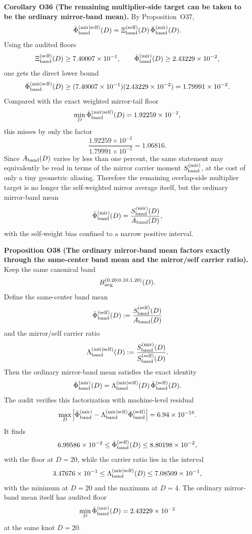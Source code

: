 \documentclass[aps,prd,onecolumn,notitlepage,nofootinbib,superscriptaddress,11pt,floatfix]{revtex4-2}
\begin{document}
\medskip\noindent\textbf{Corollary O36 (The remaining multiplier-side target can be taken to be the ordinary mirror-band mean).}
By Proposition~O37,
\[
\bar\Phi_{\rm band}^{\rm(mir|self)}(D)
=
\Xi_{\rm band}^{\rm(self)}(D)\,\bar\Phi_{\rm band}^{\rm(mir)}(D).
\]
Using the audited floors
\[
\Xi_{\rm band}^{\rm(self)}(D)\ge 7.40007\times10^{-1},
\qquad
\bar\Phi_{\rm band}^{\rm(mir)}(D)\ge 2.43229\times10^{-2},
\]
one gets the direct lower bound
\[
\bar\Phi_{\rm band}^{\rm(mir|self)}(D)
\ge
(7.40007\times10^{-1})(2.43229\times10^{-2})
=
1.79991\times10^{-2}.
\]
Compared with the exact weighted mirror-tail floor
\[
\min_D \bar\Phi_{\rm band}^{\rm(mir|self)}(D)
=
1.92259\times10^{-2},
\]
this misses by only the factor
\[
\frac{1.92259\times10^{-2}}{1.79991\times10^{-2}}
=
1.06816.
\]
Since \(A_{\rm band}(D)\) varies by less than one percent, the same statement may equivalently be read in terms of the mirror carrier moment \(S_{\rm band}^{\rm(mir)}\), at the cost of only a tiny geometric aliasing. Therefore the remaining overlap-side multiplier target is no longer the self-weighted mirror average itself, but the ordinary mirror-band mean
\[
\bar\Phi_{\rm band}^{\rm(mir)}(D)
=
\frac{S_{\rm band}^{\rm(mir)}(D)}{A_{\rm band}(D)},
\]
with the self-weight bias confined to a narrow positive interval.

\medskip\noindent\textbf{Proposition O38 (The ordinary mirror-band mean factors exactly through the same-center band mean and the mirror/self carrier ratio).}
Keep the same canonical band
\[
B_{\rm neg}^{(0.20;0.10,1.20)}(D).
\]
Define the same-center band mean
\[
\bar\Phi_{\rm band}^{\rm(self)}(D)
:=
\frac{S_{\rm band}^{\rm(self)}(D)}{A_{\rm band}(D)}
\]
and the mirror/self carrier ratio
\[
\Lambda_{\rm band}^{\rm(mir|self)}(D)
:=
\frac{S_{\rm band}^{\rm(mir)}(D)}{S_{\rm band}^{\rm(self)}(D)}.
\]
Then the ordinary mirror-band mean satisfies the exact identity
\[
\bar\Phi_{\rm band}^{\rm(mir)}(D)
=
\Lambda_{\rm band}^{\rm(mir|self)}(D)\,\bar\Phi_{\rm band}^{\rm(self)}(D).
\]
The audit
verifies this factorization with machine-level residual
\[
\max_D\left|
\bar\Phi_{\rm band}^{\rm(mir)}
-
\Lambda_{\rm band}^{\rm(mir|self)}\bar\Phi_{\rm band}^{\rm(self)}
\right|
=
6.94\times10^{-18}.
\]
It finds
\[
6.99586\times10^{-2}
\le
\bar\Phi_{\rm band}^{\rm(self)}(D)
\le
8.80198\times10^{-2},
\]
with the floor at \(D=20\), while the carrier ratio lies in the interval
\[
3.47676\times10^{-1}
\le
\Lambda_{\rm band}^{\rm(mir|self)}(D)
\le
7.08509\times10^{-1},
\]
with the minimum at \(D=20\) and the maximum at \(D=4\). The ordinary mirror-band mean itself has audited floor
\[
\min_D \bar\Phi_{\rm band}^{\rm(mir)}(D)
=
2.43229\times10^{-2}
\]
at the same knot \(D=20\).
\end{document}
